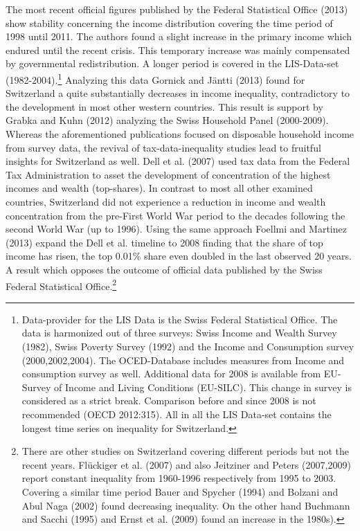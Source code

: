 \documentclass[twoside]{article}\usepackage[]{graphicx}\usepackage[]{color}
\begin{document}
\begin{multicols}{2}
The most recent official figures published by the Federal Statistical Office (2013) show  stability concerning the income distribution covering the time period of 1998 until 2011. The authors found a slight increase in the primary income which endured until the recent crisis. This temporary increase was mainly compensated by governmental redistribution. A longer period is covered in the LIS-Data-set (1982-2004).\footnote{Data-provider for the LIS Data is the Swiss Federal Statistical Office. The data is harmonized out of three surveys: Swiss Income and Wealth Survey (1982), Swiss Poverty Survey (1992) and the Income and Consumption survey (2000,2002,2004). The OCED-Database includes measures from Income and consumption survey as well. Additional data for 2008 is available from EU-Survey of Income and Living Conditions (EU-SILC). This change in survey is considered as a strict break. Comparison before and since 2008 is not recommended (OECD 2012:315). All in all the LIS Data-set contains the longest time series on inequality for Switzerland.} Analyzing this data Gornick and Jäntti (2013) found for Switzerland a quite substantially decreases in income inequality, contradictory to the development in most other western countries. This result is support by Grabka and Kuhn (2012) analyzing the Swiss Household Panel (2000-2009). \\


Whereas the aforementioned publications focused on disposable household income from survey data, the revival of tax-data-inequality studies lead to fruitful insights for Switzerland as well. Dell et al. (2007) used tax data from the Federal Tax Administration to asset the development of concentration of the highest incomes and wealth (top-shares). In contrast to most all other examined countries, Switzerland did not experience a reduction in income and wealth concentration from the pre-First World War period to the decades following the second World War (up to 1996). Using the same approach Foellmi and Martinez (2013) expand the Dell et al. timeline to 2008 finding that the share of top income has risen, the top 0.01\% share even doubled in the last observed 20 years. A result which opposes the outcome of official data published by the Swiss Federal Statistical Office.\footnote{There are other studies on Switzerland covering different periods but not the recent years. Flückiger et al. (2007) and also Jeitziner and Peters (2007,2009) report constant inequality from 1960-1996 respectively from 1995 to 2003. Covering a similar time period Bauer and Spycher (1994) and Bolzani and Abul Naga (2002) found decreasing inequality. On the other hand Buchmann and Sacchi (1995) and Ernst et al. (2009) found an increase in the 1980s).} \\



\end{multicols}
\end{document}
